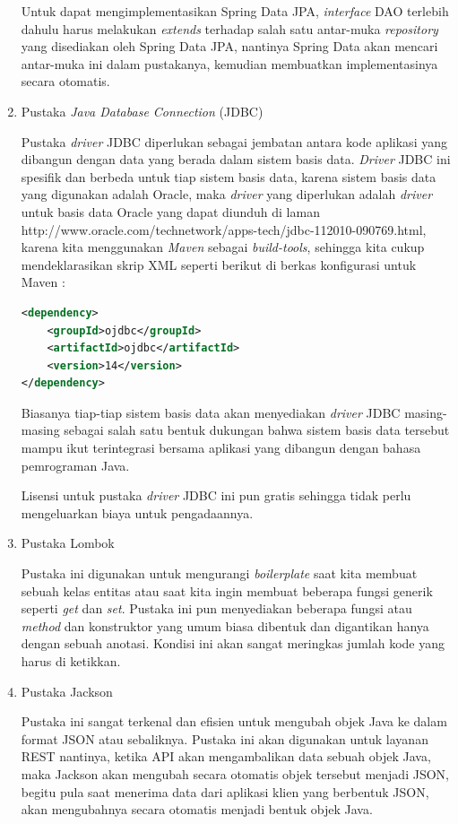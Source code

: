 \documentclass[pdftex,12pt, oneside]{article}
\begin{document}
\begin{enumerate}
Untuk dapat mengimplementasikan Spring Data JPA, \textit{interface} DAO terlebih dahulu harus melakukan \textit{extends} terhadap salah satu antar-muka \textit{repository} yang disediakan oleh Spring Data JPA, nantinya Spring Data akan mencari antar-muka ini dalam pustakanya, kemudian membuatkan implementasinya secara otomatis.
	
	\item Pustaka \textit{Java Database Connection} (JDBC)
	
Pustaka \textit{driver} JDBC diperlukan sebagai jembatan antara kode aplikasi yang dibangun dengan data yang berada dalam sistem basis data. \textit{Driver} JDBC ini spesifik dan berbeda untuk tiap sistem basis data, karena sistem basis data yang digunakan adalah Oracle, maka \textit{driver} yang diperlukan adalah \textit{driver} untuk basis data Oracle yang dapat diunduh di laman http://www.oracle.com/technetwork/apps-tech/jdbc-112010-090769.html, karena kita menggunakan \textit{Maven} sebagai \textit{build-tools}, sehingga kita cukup mendeklarasikan skrip XML seperti berikut di berkas konfigurasi untuk Maven :

\begin{lstlisting}[language=XML]
<dependency>
    <groupId>ojdbc</groupId>
    <artifactId>ojdbc</artifactId>
    <version>14</version>
</dependency>
\end{lstlisting}	

Biasanya tiap-tiap sistem basis data akan menyediakan \textit{driver} JDBC masing-masing sebagai salah satu bentuk dukungan bahwa sistem basis data tersebut mampu ikut terintegrasi bersama aplikasi yang dibangun dengan bahasa pemrograman Java.

Lisensi untuk pustaka \textit{driver} JDBC ini pun gratis sehingga tidak perlu mengeluarkan biaya untuk pengadaannya.
	
	\item Pustaka Lombok
	
Pustaka ini digunakan untuk mengurangi \textit{boilerplate} saat kita membuat sebuah kelas entitas atau saat kita ingin membuat beberapa fungsi generik seperti \textit{get} dan \textit{set}. Pustaka ini pun menyediakan beberapa fungsi atau \textit{method} dan konstruktor yang umum biasa dibentuk dan digantikan hanya dengan sebuah anotasi.	Kondisi ini akan sangat meringkas jumlah kode yang harus di ketikkan.
	
	\item Pustaka Jackson
	
Pustaka ini sangat terkenal dan efisien untuk mengubah objek Java ke dalam format JSON atau sebaliknya.	Pustaka ini akan digunakan untuk layanan REST nantinya, ketika API akan mengambalikan data sebuah objek Java, maka Jackson akan mengubah secara otomatis objek tersebut menjadi JSON, begitu pula saat menerima data dari aplikasi klien yang berbentuk JSON, akan mengubahnya secara otomatis menjadi bentuk objek Java.
	
\end{enumerate}
\end{document}
